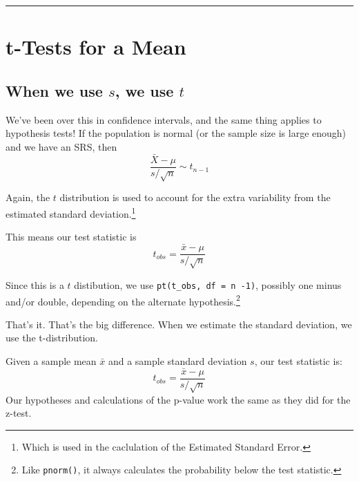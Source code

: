\documentclass[
  letterpaper,
  DIV=11,
  numbers=noendperiod,
  oneside]{scrreprt}
\begin{document}
\begin{center}\rule{0.5\linewidth}{0.5pt}\end{center}

\hypertarget{t-tests-for-a-mean}{%
\chapter{t-Tests for a Mean}\label{t-tests-for-a-mean}}

\hypertarget{when-we-use-s-we-use-t}{%
\section{\texorpdfstring{When we use \(s\), we use
\(t\)}{When we use s, we use t}}\label{when-we-use-s-we-use-t}}

We've been over this in confidence intervals, and the same thing applies
to hypothesis tests! If the population is normal (or the sample size is
large enough) and we have an SRS, then \[
\frac{\bar X - \mu}{s/\sqrt{n}}\sim t_{n-1}
\]

Again, the \(t\) distribution is used to account for the extra
variability from the estimated standard deviation.\footnote{Which is
  used in the caclulation of the Estimated Standard Error.}

This means our test statistic is \[
t_{obs} = \frac{\bar x - \mu}{s/\sqrt{n}}
\]

Since this is a \(t\) distibution, we use
\texttt{pt(t\_obs,\ df\ =\ n\ -1)}, possibly one minus and/or double,
depending on the alternate hypothesis.\footnote{Like \texttt{pnorm()},
  it always calculates the probability below the test statistic.}

That's it. That's the big difference. When we estimate the standard
deviation, we use the t-distribution.

\begin{tcolorbox}[enhanced jigsaw, toprule=.15mm, colbacktitle=quarto-callout-warning-color!10!white, title=\textcolor{quarto-callout-warning-color}{\faExclamationTriangle}\hspace{0.5em}{The t-test for a population mean}, arc=.35mm, colframe=quarto-callout-warning-color-frame, colback=white, titlerule=0mm, left=2mm, bottomtitle=1mm, bottomrule=.15mm, breakable, opacitybacktitle=0.6, leftrule=.75mm, toptitle=1mm, coltitle=black, rightrule=.15mm, opacityback=0]

Given a sample mean \(\bar x\) and a sample standard deviation \(s\),
our test statistic is: \[
t_{obs} = \frac{\bar x - \mu}{s/\sqrt{n}}
\] Our hypotheses and calculations of the p-value work the same as they
did for the z-test.

\end{tcolorbox}
\end{document}
